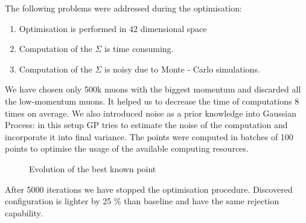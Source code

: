 \documentclass[a4paper]{jpconf}
\theoremstyle{my_theorem_style}
\numberwithin{equation}{section}
\begin{document}
The following problems were addressed during the optimisation:
\begin{enumerate}
\item Optimisation is performed in 42 dimensional space
\item Computation of the $\Sigma$ is time consuming.
\item Computation of the $\Sigma$ is noisy due to Monte - Carlo simulations.
\end{enumerate}

We have chosen only 500k muons with the biggest momentum and discarded all the low-momentum muons. It helped us to decrease the time of computations 8 times on average. We also introduced noise as a prior knowledge into Gaussian Process: in this setup GP tries to estimate the noise of the computation and incorporate it into final variance. The points were computed in batches of 100 points to optimise the usage of the available computing resources.

\begin{figure}[H]
\caption{Evolution of the best known point}
\end{figure}


After 5000 iterations we have stopped the optimisation procedure. Discovered configuration is lighter by 25 \% than baseline and have the same rejection capability. 
\end{document}
